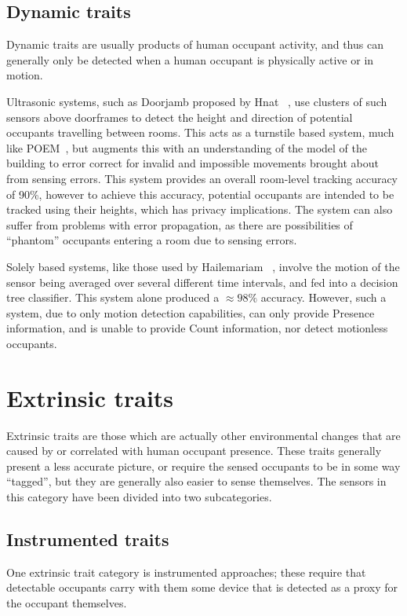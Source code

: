 \documentclass[../thesis/thesis.tex]{subfiles}
\begin{document}
\subsection{Dynamic traits}
\label{subsubsec:litreview:sensors:intrinsic:dynamic}
Dynamic traits are usually products of human occupant activity, and thus can generally only be detected when a human occupant is physically active or in motion.

Ultrasonic systems, such as Doorjamb proposed by Hnat \etal~\cite{hnat2012doorjamb}, use clusters of such sensors above doorframes to detect the height and direction of potential occupants travelling between rooms. This acts as a turnstile based system, much like POEM~\cite{erickson2013poem}, but augments this with an understanding of the model of the building to error correct for invalid and impossible movements brought about from sensing errors. This system provides an overall room-level tracking accuracy of 90\%, however to achieve this accuracy, potential occupants are intended to be tracked using their heights, which has privacy implications. The system can also suffer from problems with error propagation, as there are possibilities of ``phantom'' occupants entering a room due to sensing errors.

Solely \pir based systems, like those used by Hailemariam \etal~\cite{hailemariam2011real}, involve the motion of the sensor being averaged over several different time intervals, and fed into a decision tree classifier. This \pir system alone produced a $\approx98\%$ accuracy. However, such a system, due to only motion detection capabilities, can only provide Presence information, and is unable to provide Count information, nor detect motionless occupants.

\section{Extrinsic traits}
\label{subsec:litreview:sensors:extrinsic}
Extrinsic traits are those which are actually other environmental changes that are caused by or correlated with human occupant presence. These traits generally present a less accurate picture, or require the sensed occupants to be in some way ``tagged'', but they are generally also easier to sense themselves. The sensors in this category have been divided into two subcategories.

\subsection{Instrumented traits}
\label{subsubsec:litreview:sensors:extrinsic:instrumented}
One extrinsic trait category is instrumented approaches; these require that detectable occupants carry with them some device that is detected as a proxy for the occupant themselves.
\end{document}
